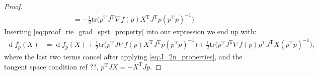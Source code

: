 \begin{proof}
\begin{align}
        &=-\tfrac{1}{2} \mathrm{tr}\big(p ^{\mathrm{T}}J ^{\mathrm{T}} \nabla f(p)X ^{\mathrm{T}}J ^{\mathrm{T}}p(p ^{\mathrm{T}}p)^{-1}\big) \label{eq:proof_rie_grad_spst_property}
    \end{align}
    Inserting \eqref{eq:proof_rie_grad_spst_property} into our expression we end up with:
    \begin{equation*}
        \begin{split}
            \operatorname{d}f_{p}(X)&= \operatorname{d}f_{p}(X)+\tfrac{1}{2} \mathrm{tr}\big(p ^{\mathrm{T}}J \nabla f(p)X ^{\mathrm{T}}J ^{\mathrm{T}}p(p ^{\mathrm{T}}p)^{-1}\big)+\tfrac{1}{2}\mathrm{tr}\big(p ^{\mathrm{T}}J ^{\mathrm{T}}\nabla f(p) p ^{\mathrm{T}}J ^{\mathrm{T}}X(p ^{\mathrm{T}}p)^{-1}\big),
        \end{split}
    \end{equation*}
    where the last two terms cancel after applying \eqref{eq:J_2n_properties}, and the tangent space condition ref ??, $p ^{\mathrm{T}}JX=-X ^{\mathrm{T}}Jp$.
\end{proof}